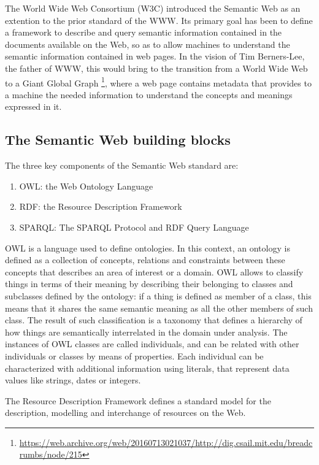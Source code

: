 \documentclass[%
    corpo=13.5pt,
    twoside,
    oldstyle,
    tipotesi=magistrale,
    greek,
    evenboxes
]{toptesi}
\begin{document}
The World Wide Web Consortium (W3C) introduced the Semantic Web as an extention
to the prior standard of the WWW. Its primary goal has been
to define a framework to describe and query semantic information contained
in the documents available on the Web, so as to allow machines to understand
the semantic information contained in web pages. In the vision of Tim
Berners-Lee, the father of WWW, this would bring to the transition from a
World Wide Web to a Giant Global Graph
\footnote{\url{https://web.archive.org/web/20160713021037/http://dig.csail.mit.edu/breadcrumbs/node/215}},
where a web page contains metadata that provides to a machine the needed
information to understand the concepts and meanings expressed in it.


\subsection{The Semantic Web building blocks}
\label{subsec:semanticweb}

The three key components of the Semantic Web standard are:
\begin{enumerate}
\item OWL: the Web Ontology Language\cite{mcguinness2004}
\item RDF: the Resource Description Framework\cite{lassila1998}
\item SPARQL: The SPARQL Protocol and RDF Query Language
\end{enumerate}
\bigskip

OWL is a language used to define ontologies. In this context, an ontology
is defined as a collection of concepts, relations and constraints between
these concepts that describes an area of interest or a domain.
OWL allows to classify things in terms of their meaning by describing
their belonging to classes and subclasses defined by the ontology: if
a thing is defined as member of a class, this means that it shares the
same semantic meaning as all the other members of such class. The result of
such classification is a taxonomy that defines a hierarchy of how things
are semantically interrelated in the domain under analysis.
The instances of OWL classes are called individuals, and can be related
with other individuals or classes by means of properties. Each individual
can be characterized with additional information using literals, that
represent data values like strings, dates or integers.
\newline

The Resource Description Framework defines a standard model for the
description, modelling and interchange of resources on the Web.
\end{document}
